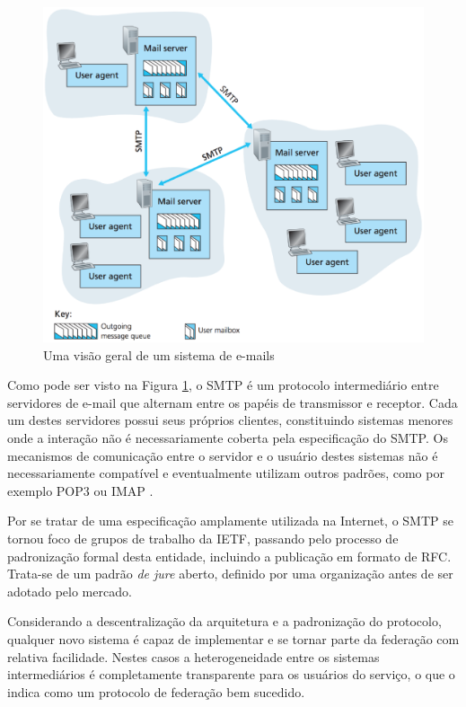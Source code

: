 \begin{figure}[h]
	\centering
		\includegraphics[keepaspectratio=true,scale=0.6]{figuras/smtp_internet.eps}
	\caption{Uma visão geral de um sistema de e-mails \cite{kurose2012}}
	\label{fig:smtpInternet}
\end{figure}

Como pode ser visto na Figura \ref{fig:smtpInternet}, o SMTP é um protocolo
intermediário entre servidores de e-mail que alternam entre os papéis de transmissor
e receptor. Cada um destes servidores possui seus próprios clientes, constituindo
sistemas menores onde a interação não é necessariamente coberta pela especificação
do SMTP. Os mecanismos de comunicação entre o servidor e o usuário destes sistemas
não é necessariamente compatível e eventualmente utilizam outros padrões, como por
exemplo POP3 ou IMAP \cite{tanenbaum2010}.

Por se tratar de uma especificação amplamente utilizada na Internet, o SMTP se
tornou foco de grupos de trabalho da IETF, passando pelo processo de padronização
formal desta entidade, incluindo a publicação em formato de RFC. Trata-se de um
padrão \textit{de jure} aberto, definido por uma organização antes de ser adotado
pelo mercado.

Considerando a descentralização da arquitetura e a padronização do protocolo,
qualquer novo sistema é capaz de implementar e se tornar parte da federação com
relativa facilidade. Nestes casos a heterogeneidade entre os sistemas intermediários
é completamente transparente para os usuários do serviço, o que o indica como um
protocolo de federação bem sucedido.



